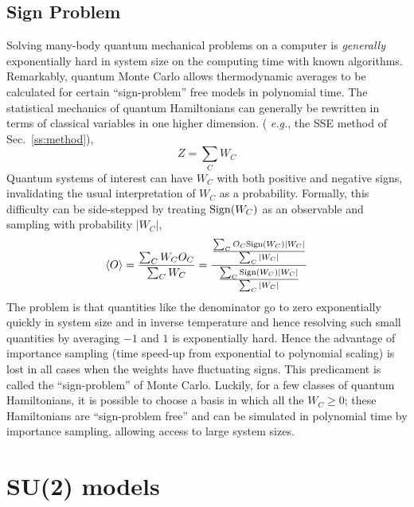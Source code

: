 \documentclass[range]{ar2e}
\begin{document}
\subsection{Sign Problem}
\label{ss:sign}

Solving many-body quantum mechanical problems on a computer is {\em generally}
exponentially hard in system size on the computing time with known
algorithms. Remarkably, quantum Monte Carlo allows thermodynamic
averages to be calculated for certain ``sign-problem'' free models
in polynomial time. The statistical mechanics of quantum Hamiltonians can generally be
rewritten in terms of classical
variables in one higher dimension. ( {\em e.g.}, the SSE method of Sec.~\ref{ss:method}),
\begin{equation}
\label{eq:wc}
Z=\sum_C W_C
\end{equation}
Quantum systems of interest can have $W_C$ with both
positive and negative signs, invalidating the usual interpretation of
$W_C$ as a probability. Formally, this difficulty can be side-stepped
by treating ${\rm  Sign} (W_C)$ as an observable and sampling with
probability $|W_C|$,
\begin{equation}
\langle O \rangle = \frac{\sum_C W_C O_C}{\sum_C W_C} =
\frac{\frac{\sum_C O_C {\rm Sign}(W_C) |W_C|}{\sum_{C}|W_C|}}{\frac{\sum_C
    {\rm Sign}(W_C)|W_C|}{\sum_{C}|W_C|}}
\end{equation}
The problem is that quantities like the denominator go to zero
exponentially quickly in system size and in inverse temperature and hence
resolving such small quantities by averaging $-1$ and $1$ is
exponentially hard. Hence the advantage of importance sampling (time speed-up
from exponential to polynomial scaling) is
lost in all cases when the weights have fluctuating signs. This predicament is called the ``sign-problem'' of
Monte Carlo. Luckily, for a few classes of quantum Hamiltonians, it is possible to
choose a basis in which all the $W_C\geq 0$; these Hamiltonians are
``sign-problem free'' and can be simulated in polynomial time by
importance sampling, allowing access to large system sizes. 

 

\section{SU(2) models}
\label{sec:su2models}
\end{document}
